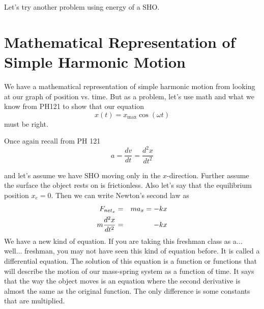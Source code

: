 \documentclass{book}
\begin{document}
Let's try another problem using energy of a SHO.

\section{Mathematical Representation of Simple Harmonic Motion}

We have a mathematical representation of simple harmonic motion from looking
at our graph of position vs. time. But as a problem, let's use math and what
we know from PH121 to show that our equation 
\begin{equation*}
x\left( t\right) =x_{\max }\cos \left( \omega t\right)
\end{equation*}%
must be right.

Once again recall from PH 121 
\begin{equation}
a=\frac{dv}{dt}=\frac{d^{2}x}{dt^{2}}
\end{equation}

and let's assume we have SHO moving only in the $x$-direction. %
Further assume the surface the object rests on is frictionless. Also let's
say that the equilibrium position $x_{e}=0.$ Then we can write Newton's
second law as%
\begin{eqnarray}
F_{net_{x}} &=&ma_{x}=-kx \\
m\frac{d^{2}x}{dt^{2}} &=&-kx  \notag
\end{eqnarray}%
We have a new kind of equation. If you are taking this freshman class as
a... well... freshman, you may not have seen this kind of equation before.
It is called a differential equation. The solution of this equation is a
function or functions that will describe the motion of our mass-spring
system as a function of time. It says that the way the object moves is an
equation where the second derivative is almost the same as the original
function. The only difference is some constants that are multiplied.
\end{document}
